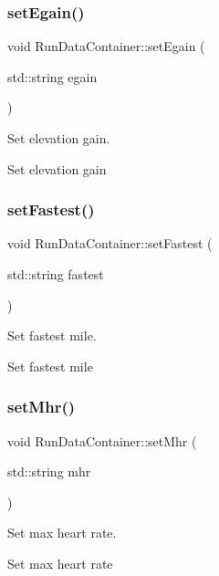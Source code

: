 \subsubsection{\texorpdfstring{setEgain()}{setEgain()}}
{\footnotesize\ttfamily void Run\+Data\+Container\+::set\+Egain (\begin{DoxyParamCaption}\item[{std\+::string}]{egain }\end{DoxyParamCaption})}



Set elevation gain. 

Set elevation gain \mbox{\label{classRunDataContainer_a5a8a3e05193d52b47d9967b2ddb917e2}} 
\subsubsection{\texorpdfstring{setFastest()}{setFastest()}}
{\footnotesize\ttfamily void Run\+Data\+Container\+::set\+Fastest (\begin{DoxyParamCaption}\item[{std\+::string}]{fastest }\end{DoxyParamCaption})}



Set fastest mile. 

Set fastest mile \mbox{\label{classRunDataContainer_a08abdd019d8436446faba4de57f20b12}} 
\subsubsection{\texorpdfstring{setMhr()}{setMhr()}}
{\footnotesize\ttfamily void Run\+Data\+Container\+::set\+Mhr (\begin{DoxyParamCaption}\item[{std\+::string}]{mhr }\end{DoxyParamCaption})}



Set max heart rate. 

Set max heart rate \mbox{\label{classRunDataContainer_a5422f9dbba64149560f94b9d4eaba524}} 
